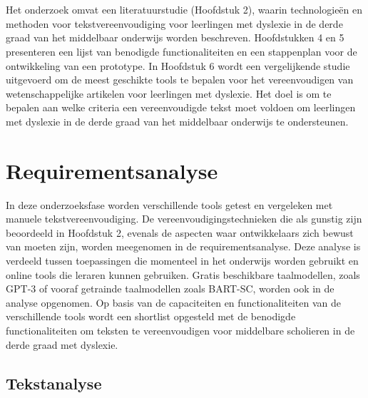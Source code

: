 
\chapter{}%
\label{ch:methodologie}

Het onderzoek omvat een literatuurstudie (Hoofdstuk 2), waarin technologieën en methoden voor tekstvereenvoudiging voor leerlingen met dyslexie in de derde graad van het middelbaar onderwijs worden beschreven. Hoofdstukken 4 en 5 presenteren een lijst van benodigde functionaliteiten en een stappenplan voor de ontwikkeling van een prototype. In Hoofdstuk 6 wordt een vergelijkende studie uitgevoerd om de meest geschikte tools te bepalen voor het vereenvoudigen van wetenschappelijke artikelen voor leerlingen met dyslexie. Het doel is om te bepalen aan welke criteria een vereenvoudigde tekst moet voldoen om leerlingen met dyslexie in de derde graad van het middelbaar onderwijs te ondersteunen.


\chapter{Requirementsanalyse}

In deze onderzoeksfase worden verschillende tools getest en vergeleken met manuele tekstvereenvoudiging. De vereenvoudigingstechnieken die als gunstig zijn beoordeeld in Hoofdstuk 2, evenals de aspecten waar ontwikkelaars zich bewust van moeten zijn, worden meegenomen in de requirementsanalyse. Deze analyse is verdeeld tussen toepassingen die momenteel in het onderwijs worden gebruikt en online tools die leraren kunnen gebruiken. Gratis beschikbare taalmodellen, zoals GPT-3 of vooraf getrainde taalmodellen zoals BART-SC, worden ook in de analyse opgenomen. Op basis van de capaciteiten en functionaliteiten van de verschillende tools wordt een shortlist opgesteld met de benodigde functionaliteiten om teksten te vereenvoudigen voor middelbare scholieren in de derde graad met dyslexie.

\section{Tekstanalyse}

